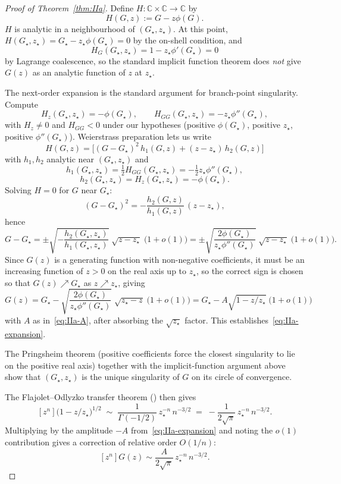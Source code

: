 \documentclass[11pt,a4paper]{article}
\newcommand{\C}{\mathbb{C}}
\theoremstyle{plain}
\theoremstyle{definition}
\begin{document}
\begin{proof}[Proof of Theorem~\ref{thm:IIa}]
Define $H: \C \times \C \to \C$ by
\[
  H(G, z) := G - z\phi(G).
\]
$H$ is analytic in a neighbourhood of $(G_\star, z_\star)$.  At this
point, $H(G_\star, z_\star) = G_\star - z_\star\phi(G_\star) = 0$ by the
on-shell condition, and
\[
  H_G(G_\star, z_\star) = 1 - z_\star\phi'(G_\star) = 0
\]
by Lagrange coalescence, so the standard implicit function theorem
does \emph{not} give $G(z)$ as an analytic function of $z$ at
$z_\star$.

The next-order expansion is the standard argument for branch-point
singularity.  Compute
\[
  H_z(G_\star, z_\star) = -\phi(G_\star), \qquad
  H_{GG}(G_\star, z_\star) = -z_\star \phi''(G_\star),
\]
with $H_z \neq 0$ and $H_{GG} < 0$ under our hypotheses
(positive $\phi(G_\star)$, positive $z_\star$, positive $\phi''(G_\star)$).
Weierstrass preparation lets us write
\[
  H(G, z) = \bigl[(G - G_\star)^2\, h_1(G, z) + (z - z_\star)\, h_2(G, z)\bigr]
\]
with $h_1, h_2$ analytic near $(G_\star, z_\star)$ and
\[
  h_1(G_\star, z_\star) = \tfrac{1}{2} H_{GG}(G_\star, z_\star)
    = -\tfrac{1}{2} z_\star \phi''(G_\star),
\]
\[
  h_2(G_\star, z_\star) = H_z(G_\star, z_\star) = -\phi(G_\star).
\]
Solving $H = 0$ for $G$ near $G_\star$:
\[
  (G - G_\star)^2 = -\frac{h_2(G,z)}{h_1(G,z)}\,(z - z_\star),
\]
hence
\[
  G - G_\star = \pm\sqrt{-\frac{h_2(G_\star,z_\star)}{h_1(G_\star,z_\star)}}
   \; \sqrt{z - z_\star}\;
   \bigl(1 + o(1)\bigr)
   = \pm \sqrt{\frac{2\phi(G_\star)}{z_\star \phi''(G_\star)}}\;\sqrt{z - z_\star}\;\bigl(1 + o(1)\bigr).
\]
Since $G(z)$ is a generating function with non-negative coefficients,
it must be an increasing function of $z > 0$ on the real axis up to
$z_\star$, so the correct sign is chosen so that $G(z) \nearrow G_\star$
as $z \nearrow z_\star$, giving
\[
  G(z) = G_\star - \sqrt{\frac{2\phi(G_\star)}{z_\star \phi''(G_\star)}}\;
    \sqrt{z_\star - z}\;\bigl(1 + o(1)\bigr)
  = G_\star - A\sqrt{1 - z/z_\star}\;\bigl(1 + o(1)\bigr)
\]
with $A$ as in~\eqref{eq:IIa-A}, after absorbing the $\sqrt{z_\star}$
factor.  This establishes~\eqref{eq:IIa-expansion}.

The Pringsheim theorem (positive coefficients force the closest
singularity to lie on the positive real axis) together with the
implicit-function argument above show that $(G_\star, z_\star)$ is the
unique singularity of $G$ on its circle of convergence.

The Flajolet--Odlyzko transfer theorem
(\citep[Thm.\ VI.1]{FlajoletSedgewick}) then gives
\[
  [z^n]\bigl(1 - z/z_\star\bigr)^{1/2} \;\sim\; \frac{1}{\Gamma(-1/2)}\,
  z_\star^{-n}\, n^{-3/2} \;=\; -\frac{1}{2\sqrt{\pi}}\,z_\star^{-n}\, n^{-3/2}.
\]
Multiplying by the amplitude $-A$ from~\eqref{eq:IIa-expansion} and
noting the $o(1)$ contribution gives a correction of relative order
$O(1/n)$:
\[
  [z^n] G(z) \sim \frac{A}{2\sqrt{\pi}}\, z_\star^{-n}\, n^{-3/2}.
\]
\end{proof}
\end{document}
